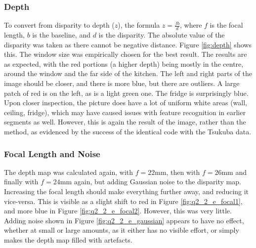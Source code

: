 \documentclass[a4paper, 10pt, conference]{ieeeconf}
\begin{document}
\subsubsection{Depth}

To convert from disparity to depth ($z$), the formula $z = \frac{fb}{d}$, where $f$ is the focal length, $b$ is the baseline, and $d$ is the disparity. The absolute value of the disparity was taken as there cannot be negative distance. Figure \ref{fig:depth} shows this. The window size was empirically chosen for the best result. The results are as expected, with the red portions (a higher depth) being mostly in the centre, around the window and the far side of the kitchen. The left and right parts of the image should be closer, and there is more blue, but there are outliers. A large patch of red is on the left, as is a light green one. The fridge is surprisingly blue. Upon closer inspection, the picture does have a lot of uniform white areas (wall, ceiling, fridge), which may have caused issues with feature recognition in earlier segments as well. However, this is again the result of the image, rather than the method, as evidenced by the success of the identical code with the Tsukuba data.

\subsubsection{Focal Length and Noise}

The depth map was calculated again, with $f = 22\text{mm}$, then with $f = 26\text{mm}$ and finally with $f = 24\text{mm}$ again, but adding Gaussian noise to the disparity map. Increasing the focal length should make everything further away, and reducing it vice-versa. This is visible as a slight shift to red in Figure \ref{fig:q2_2_e_focal1}, and more blue in Figure \ref{fig:q2_2_e_focal2}. However, this was very little. Adding noise shown in Figure \ref{fig:q2_2_e_gaussian} appears to have no effect, whether at small or large amounts, as it either has no visible effort, or simply makes the depth map filled with artefacts.
\end{document}
